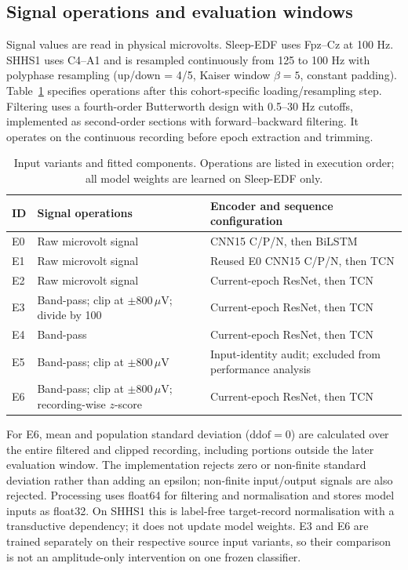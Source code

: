 \documentclass[10pt,a4paper]{article}
\begin{document}
\subsection*{Signal operations and evaluation windows}

Signal values are read in physical microvolts. Sleep-EDF uses Fpz--Cz at 100 Hz. SHHS1 uses C4--A1
and is resampled continuously from 125 to 100 Hz with polyphase resampling (up/down = 4/5,
Kaiser window $\beta=5$, constant padding). Table~\ref{tab:sup_variants} specifies operations after
this cohort-specific loading/resampling step. Filtering uses a fourth-order Butterworth design
with 0.5--30 Hz cutoffs, implemented as second-order sections with forward--backward filtering.
It operates on the continuous recording before epoch extraction and trimming.

\begin{table}[H]
\centering\small
\caption{Input variants and fitted components. Operations are listed in execution order; all
model weights are learned on Sleep-EDF only.}
\label{tab:sup_variants}
\begin{tabularx}{\textwidth}{lXX}
\toprule
ID & Signal operations & Encoder and sequence configuration \\
\midrule
E0 & Raw microvolt signal & CNN15 C/P/N, then BiLSTM \\
E1 & Raw microvolt signal & Reused E0 CNN15 C/P/N, then TCN \\
E2 & Raw microvolt signal & Current-epoch ResNet, then TCN \\
E3 & Band-pass; clip at $\pm800\,\mu$V; divide by 100 & Current-epoch ResNet, then TCN \\
E4 & Band-pass & Current-epoch ResNet, then TCN \\
E5 & Band-pass; clip at $\pm800\,\mu$V & Input-identity audit; excluded from performance analysis \\
E6 & Band-pass; clip at $\pm800\,\mu$V; recording-wise $z$-score & Current-epoch ResNet, then TCN \\
\bottomrule
\end{tabularx}
\end{table}

For E6, mean and population standard deviation ($\mathrm{ddof}=0$) are calculated over the entire
filtered and clipped recording, including portions outside the later evaluation window. The
implementation rejects zero or non-finite standard deviation rather than adding an epsilon;
non-finite input/output signals are also rejected. Processing uses float64 for filtering and
normalisation and stores model inputs as float32. On SHHS1 this is label-free target-record
normalisation with a transductive dependency; it does not update model weights. E3 and E6 are
trained separately on their respective source input variants, so their comparison is not an
amplitude-only intervention on one frozen classifier.
\end{document}
